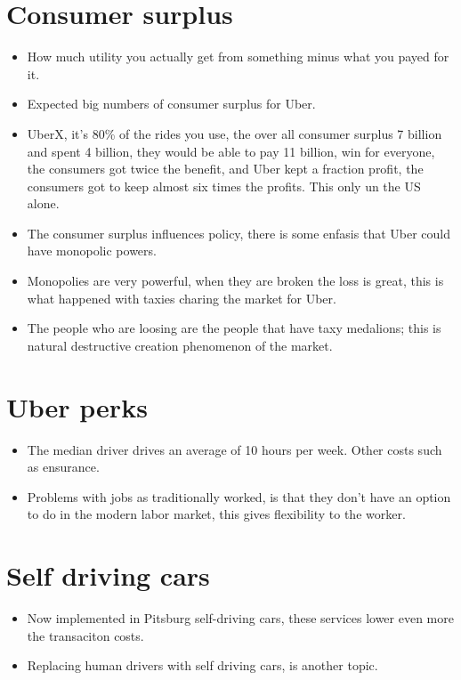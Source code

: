 \documentclass{article}
\begin{document}
\section{Consumer surplus}
\begin{itemize}
    \item How much utility you actually get from something minus what you payed for it.
    \item Expected big numbers of consumer surplus for Uber.
    \item UberX, it's 80\% of the rides you use, the over all consumer surplus 7 billion and spent 4 billion, they would be able to pay 11 billion, win for everyone, the consumers got twice the benefit, and Uber kept a fraction profit, the consumers got to keep almost six times the profits. This only un the US alone.
    \item The consumer surplus influences policy, there is some enfasis that Uber could have monopolic powers.
    \item Monopolies are very powerful, when they are broken the loss is great, this is what happened with taxies charing the market for Uber.
    \item The people who are loosing are the people that have taxy medalions; this is natural destructive creation phenomenon of the market.
\end{itemize}


\section{Uber perks}
\begin{itemize}
    \item The median driver drives an average of 10 hours per week. Other costs such as ensurance.
    \item Problems with jobs as traditionally worked, is that they don't have an option to do in the modern labor market, this gives flexibility to the worker.
\end{itemize}


\section{Self driving cars}
\begin{itemize}
    \item Now implemented in Pitsburg self-driving cars, these services lower even more the transaciton costs.
    \item Replacing human drivers with self driving cars, is another topic.
\end{itemize}
\end{document}
